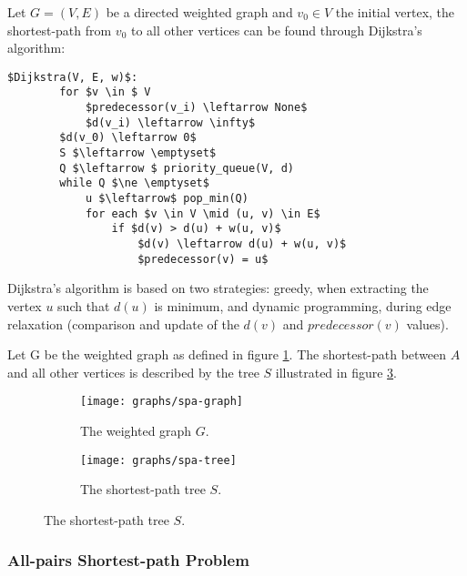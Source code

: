Let $G=(V, E)$ be a directed weighted graph and $v_0 \in V$ the initial vertex, the shortest-path from $v_0$ to all other vertices can be found through Dijkstra's algorithm:

\begin{lstlisting}[mathescape]
    $Dijkstra(V, E, w)$:
        for $v \in $ V
            $predecessor(v_i) \leftarrow None$
            $d(v_i) \leftarrow \infty$
        $d(v_0) \leftarrow 0$
        S $\leftarrow \emptyset$
        Q $\leftarrow $ priority_queue(V, d)
        while Q $\ne \emptyset$
            u $\leftarrow$ pop_min(Q)
            for each $v \in V \mid (u, v) \in E$
                if $d(v) > d(u) + w(u, v)$
                    $d(v) \leftarrow d(u) + w(u, v)$
                    $predecessor(v) = u$
\end{lstlisting}

\begin{remark}
	Dijkstra's algorithm is based on two strategies: greedy, when extracting the vertex $u$ such that $d(u)$ is minimum, and dynamic programming, during edge relaxation (comparison and update of the $d(v)$ and $predecessor(v)$ values).
\end{remark}

\begin{example}
	Let G be the weighted graph as defined in figure \ref{fig:spa-graph}. The shortest-path between $A$ and all other vertices is described by the tree $S$ illustrated in figure \ref{fig:spa-tree}.

	\begin{figure}[H]
		\centering
		\begin{subfigure}{.4\linewidth}
			\texttt{[image: graphs/spa-graph]}
			\captionsetup{justification=centering}
			\caption{The weighted graph $G$.}
			\label{fig:spa-graph}
		\end{subfigure}
		\begin{subfigure}{.4\linewidth}
			\texttt{[image: graphs/spa-tree]}
			\captionsetup{justification=centering}
			\caption{The shortest-path tree $S$.}
			\label{fig:spa-tree}
		\end{subfigure}
	\end{figure}
\end{example}

\subsubsection{All-pairs Shortest-path Problem}


